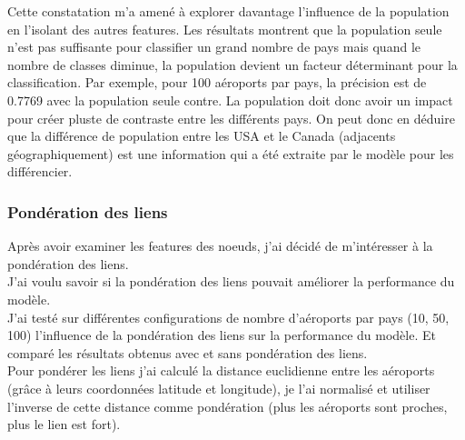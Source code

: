 Cette constatation m'a amené à explorer davantage l'influence de la population
en l'isolant des autres features. Les résultats montrent que la population
seule n'est pas suffisante pour classifier un grand nombre de pays mais quand
le nombre de classes diminue, la population devient un facteur déterminant pour
la classification. Par exemple, pour 100 aéroports par pays, la précision est
de 0.7769 avec la population seule contre. La population doit donc avoir un
impact pour créer pluste de contraste entre les différents pays. On peut donc
en déduire que la différence de population entre les USA et le Canada
(adjacents géographiquement) est une information qui a été extraite par le
modèle pour les différencier.\\

\subsubsection{Pondération des liens}

Après avoir examiner les features des noeuds, j'ai décidé de m'intéresser à la
pondération des liens.\\ J'ai voulu savoir si la pondération des liens pouvait
améliorer la performance du modèle.\\ J'ai testé sur différentes configurations
de nombre d'aéroports par pays (10, 50, 100) l'influence de la pondération des
liens sur la performance du modèle. Et comparé les résultats obtenus avec et
sans pondération des liens.\\

Pour pondérer les liens j'ai calculé la distance euclidienne entre les
aéroports (grâce à leurs coordonnées latitude et longitude), je l'ai normalisé
et utiliser l'inverse de cette distance comme pondération (plus les aéroports
sont proches, plus le lien est fort).\\


